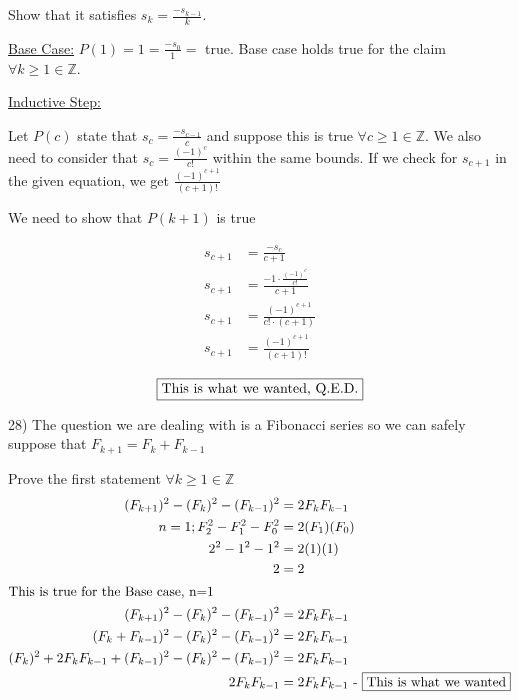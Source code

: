 \documentclass[11pt]{article}
\newcommand*{\mybox}[1]{\framebox{#1}}
\begin{document}
\begin{flushleft}
Show that it satisfies $s_k = \displaystyle{\frac{-s_{k-1}}{k}}$.

\vspace{3mm}

\underline{Base Case:} $P(1) = 1 = \displaystyle{\frac{-s_0}{1}} =$ true. Base case holds true for the claim $\forall k \geq 1 \in \mathbb{Z}$.

\vspace{3mm}

\underline{Inductive Step:} 

Let $P(c)$ state that $\displaystyle{s_c = \frac{-s_{c-1}}{c}}$ and suppose this is true $\forall c\geq 1 \in \mathbb{Z}$. We also need to consider that $s_c = \displaystyle{\frac{(-1)^c}{c!}}$ within the same bounds. If we check for $s_{c+1}$ in the given equation, we get $\displaystyle{\frac{(-1)^{c+1}}{(c+1)!}}$

We need to show that $P(k+1)$ is true

\begin{align*}
s_{c+1} &= \displaystyle{\frac{-s_c}{c+1}} \\
s_{c+1} &= \displaystyle{\frac{-1\cdot \displaystyle{\frac{(-1)^c}{c!}}}{c+1}}\\
s_{c+1} &= \displaystyle{\frac{(-1)^{c+1}}{c!\cdot (c+1)}} \\
s_{c+1} &= \displaystyle{\frac{(-1)^{c+1}}{(c+1)!}}
\end{align*}

$$\text{\mybox{This is what we wanted, Q.E.D.}}$$



\hrulefill

28) The question we are dealing with is a Fibonacci series so we can safely suppose that $F_{k+1} = F_k + F_{k-1}$ 

Prove the first statement $\forall k\geq 1 \in \mathbb{Z}$
\begin{align*}
(F_{k+1})^2 - (F_k)^2 - (F_{k-1})^2 &= 2F_kF_{k-1} \\
n = 1; F_2^2 - F_1^2 - F_0^2 &= 2(F_1)(F_0)\\
2^2-1^2-1^2 &= 2(1)(1)\\
2 &= 2 \\
\intertext{This is true for the Base case, n=1}
(F_{k+1})^2 - (F_k)^2 - (F_{k-1})^2 &= 2F_kF_{k-1} \\
(F_k + F_{k-1})^2 - (F_k)^2 - (F_{k-1})^2 &= 2F_kF_{k-1} \\
(F_k)^2 +2F_kF_{k-1} + (F_{k-1})^2 - (F_k)^2 - (F_{k-1})^2 &= 2F_kF_{k-1} \\
2F_kF_{k-1} &= 2F_kF_{k-1} \text{ - \mybox{This is what we wanted}}
\end{align*}



\end{flushleft}
\end{document}
